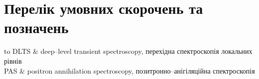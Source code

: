 \chapter*{Перелік умовних скорочень та позначень}             %
\noindent
\begin{longtabu} to \textwidth {r X}
  DLTS & deep--level transient spectroscopy, перехідна спектроскопія локальних рівнів\\
PAS & positron annihilation spectroscopy, позитронно--анігіляційна спектроскопія \\

\end{longtabu}

